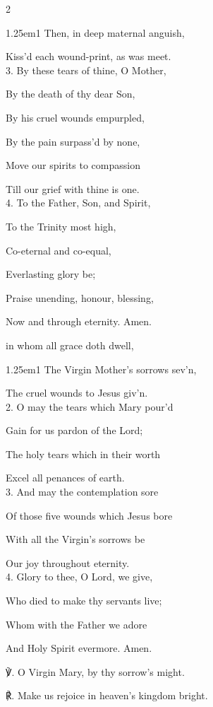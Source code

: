 \begin{paracol}{2}
\begin{hangparas}{1.25em}{1}
Then, in deep maternal anguish,

Kiss'd each wound-print, as was meet.\\

3. By these tears of thine, O Mother,

By the death of thy dear Son,

By his cruel wounds empurpled,

By the pain surpass'd by none,

Move our spirits to compassion

Till our grief with thine is one.\\

4. To the Father, Son, and Spirit,

To the Trinity most high,

Co-eternal and co-equal,

Everlasting glory be;

Praise unending, honour, blessing,

Now and through eternity. Amen.
\end{hangparas}

\mattinsOfficeHymn
{} in whom all grace doth dwell,


\begin{hangparas}{1.25em}{1}
The Virgin Mother’s sorrows sev'n,

The cruel wounds to Jesus giv'n.\\

2. O may the tears which Mary pour'd

Gain for us pardon of the Lord;

The holy tears which in their worth

Excel all penances of earth.\\

3. And may the contemplation sore

Of those five wounds which Jesus bore

With all the Virgin’s sorrows be

Our joy throughout eternity.\\

4. Glory to thee, O Lord, we give,

Who died to make thy servants live;

Whom with the Father we adore

And Holy Spirit evermore. Amen.\\
\end{hangparas}

℣. O Virgin Mary, by thy sorrow’s might.

℟. Make us rejoice in heaven’s kingdom bright.


\fussy	
\end{paracol}

